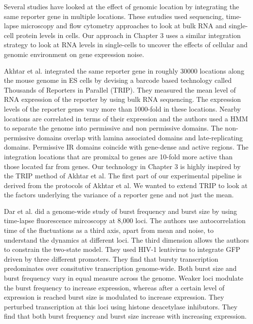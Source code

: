 Several studies have looked at the effect of genomic location by integrating the same reporter gene in multiple locations. These sutudies used sequencing, time-lapse microscopy and flow cytometry approaches to look at bulk RNA and single-cell protein levels in cells. Our approach in Chapter 3 uses a similar integration strategy to look at RNA levels in single-cells to uncover the effects of cellular and genomic environment on gene expression noise.

Akhtar et al. \cite {Akhtar} integrated the same reporter gene in roughly 30000 locations along the mouse genome in ES cells by devising a barcode based technology called Thousands of Reporters in Parallel (TRIP). They measured the mean level of RNA expression of the reporter by using bulk RNA sequencing. The expression levels of the reporter genes vary more than 1000-fold in these locations. Nearby locations are correlated in terms of their expression and the authors used a HMM to separate the genome into permissive and non permissive domains. The non-permissive domains overlap with lamina associated domains and late-replicating domains. Permissive IR domains coincide with gene-dense and active regions. The integration locations that are promixal to genes are 10-fold more active than those located far from genes. Our technology in Chapter 3 is highly inspired by the TRIP method of Akhtar et al. The first part of our experimental pipeline is derived from the protocols of Akhtar et al. We wanted to extend TRIP to look at the factors underlying the variance of a reporter gene and not just the mean.

Dar et al. \cite{Dar} did a genome-wide study of burst frequency and burst size by using time-lapse fluorescence mircoscopy at 8,000 loci. The authors use autocorrelation time of the fluctuations as a third axis, apart from mean and noise, to understand the dynamics at different loci. The third dimension allows the authors to constrain the two-state model. They used HIV-1 lentivirus to integrate GFP driven by three different promoters. They find that bursty transcription predominates over consitutive transcription genome-wide. Both burst size and burst frequency vary in equal measure across the genome. Weaker loci modulate the burst frequency to increase expression, whereas after a certain level of expression is reached burst size is modulated to increase expression. They perturbed transcription at this loci using histone deacetylase inhibutors. They find that both burst frequency and burst size increase with increasing expression. 

